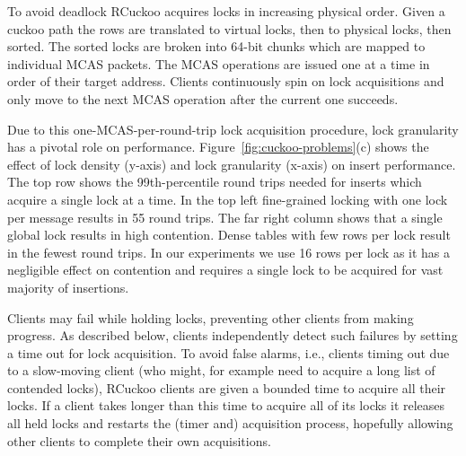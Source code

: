 To avoid deadlock RCuckoo acquires locks in increasing physical order.  Given
a cuckoo path the rows are translated to virtual locks, then to
physical locks, then sorted. The sorted locks are broken into 64-bit
chunks which are mapped to individual MCAS packets.  The MCAS
operations are issued one at a time in order of their target address.  Clients
continuously spin on lock acquisitions and only move to the next MCAS
operation after the current one succeeds.


Due to this one-MCAS-per-round-trip lock acquisition procedure, lock
granularity has a pivotal role on performance.
Figure~\ref{fig:cuckoo-problems}(c) shows the effect of lock density
(y-axis) and lock granularity (x-axis) on insert performance. The top
row shows the 99th-percentile round trips needed for inserts which
acquire a single lock at a time. In the top left fine-grained locking
with one lock per message results in 55 round trips. The far right
column shows that a single global lock results in high
contention. Dense tables with few rows per lock result in the fewest
round trips.  In our experiments we use 16 rows per lock as it has a
negligible effect on contention and requires a single lock to be
acquired for vast majority of insertions.

%









Clients may fail while holding locks, preventing other clients from
making progress.  As described below, clients independently detect
such failures by setting a time out for lock acquisition. To avoid
false alarms, i.e., clients timing out due to a slow-moving client
(who might, for example need to acquire a long list of contended
locks), RCuckoo clients are given a bounded time to acquire all their
locks. If a client takes longer than this time to acquire all of its
locks it releases all held locks and restarts the (timer and)
acquisition process, hopefully allowing other clients to complete
their own acquisitions.


